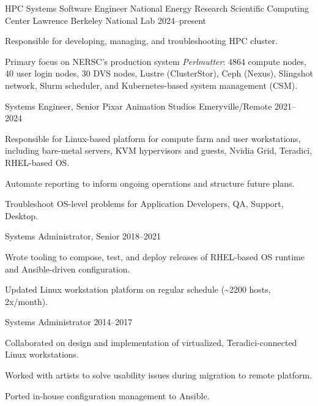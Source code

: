 

  \cventry
  {HPC Systems Software Engineer}
  {National Energy Research Scientific Computing Center}
  {Lawrence Berkeley National Lab}
  {2024--present}
  {
    \begin{cvitems}
    \item{
      Responsible for developing, managing, and troubleshooting HPC cluster.
    }
    \item{
      Primary focus on NERSC's production system \textit{Perlmutter}:
      4864 compute nodes, 40 user login nodes, 30 DVS nodes, Lustre (ClusterStor), Ceph (Nexus), Slingshot network, Slurm scheduler, and Kubernetes-based system management (CSM).
    }
    \end{cvitems}
  }

  \cventry
  {Systems Engineer, Senior}  %
  {Pixar Animation Studios}  %
  {Emeryville/Remote}  %
  {2021--2024}  %
  {
    \begin{cvitems}  %
    \item{
      Responsible for Linux-based platform for compute farm and user workstations,
      including bare-metal servers, KVM hypervisors and guests, Nvidia Grid, Teradici, RHEL-based OS.
    }
    \item{Automate reporting to inform ongoing operations and structure future plans.}
    \item{Troubleshoot OS-level problems for Application Developers, QA, Support, Desktop.}
    \end{cvitems}
  }

  \cventry
  {Systems Administrator, Senior}  %
  {}
  {}
  {2018--2021}  %
  {
    \begin{cvitems}  %
    \item {Wrote tooling to compose, test, and deploy releases of RHEL-based OS runtime and Ansible-driven configuration.}
    \item {Updated Linux workstation platform on regular schedule (\textasciitilde{}2200 hosts, 2x/month).}
    \end{cvitems}
  }

  \cventry
  {Systems Administrator}
  {}
  {}
  {2014--2017}
  {
    \begin{cvitems}
    \item {Collaborated on design and implementation of virtualized, Teradici-connected Linux workstations.}
    \item {Worked with artists to solve usability issues during migration to remote platform.}
    \item {Ported in-house configuration management to Ansible.}
    \end{cvitems}
  }

